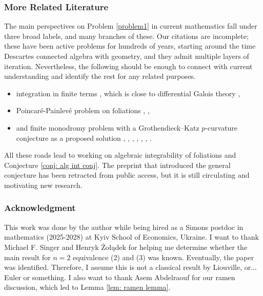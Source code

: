 \documentclass{amsart}
\theoremstyle{definition}
\begin{document}
\subsubsection{More Related Literature}

The main perspectives on Problem \ref{problem1} in current mathematics fall under three broad labels, and many branches of these. Our citations are incomplete; these have been active problems for hundreds of years, starting around the time Descartes connected algebra with geometry, and they admit multiple layers of iteration. Nevertheless, the following should be enough to connect with current understanding and identify the rest for any related purposes.
\begin{itemize}
    \item integration in finite terms \cite{rosenlicht_finite_terms_1972}, which is close to differential Galois theory \cite{diff_galois_2003},
    \item Poincaré-Painlevé problem on foliations \cite{neto_poincare_2002}, \cite{pereira_poincare_2002}, 
    \item and finite monodromy problem with a Grothendieck--Katz $p$-curvature conjecture as a proposed solution \cite{GK_katz}, \cite{Honda_p_conjecture}, \cite{GK_bost}, \cite{GK_andre},   \cite{GK-survey}, \cite{lam2026pcurvaturenonabeliancohomology}, \cite{effective_p_conjecture_2026}.
\end{itemize}
  All these roads lead to working on algebraic integrability of foliations and Conjecture \ref{conj: alg int conj}. The preprint \cite{TShBE-conjectureF} that introduced the general conjecture has been retracted from public access, but it is still circulating and motivating new research.

\subsubsection{Acknowledgment}
This work was done by the author while being hired as a Simons postdoc in mathematics (2025-2028) at Kyiv School of Economics, Ukraine. I want to thank Michael F. Singer and Henryk Żołądek for helping me determine whether the main result for $n=2$ equivalence (2) and (3) was known. Eventually, the paper \cite{rational_first_for_separated_2025} was identified. Therefore, I assume this is not a classical result by Liouville, or... Euler or something. I also want to thank Asem Abdelraouf for our ramen discussion, which led to Lemma \ref{lem: ramen lemma}.
\end{document}
